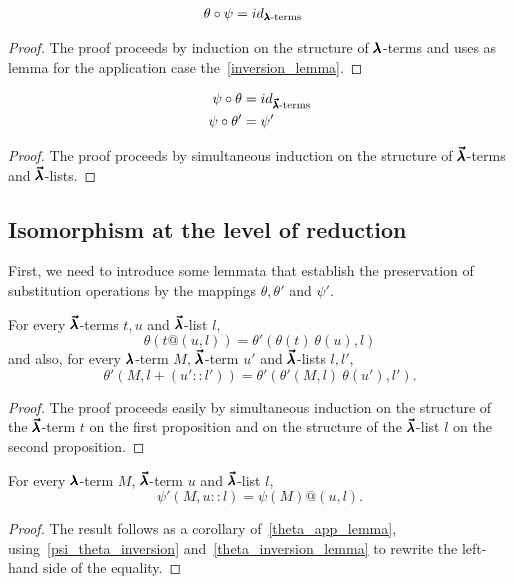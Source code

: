 \begin{theorem}
  \label{theta_psi_inversion}
  \begin{align*}
    \theta \circ \psi &= id_{\pmb{\lambda} \text{-terms}}
  \end{align*}
\end{theorem}
\begin{proof}
  The proof proceeds by induction on the structure of $\pmb{\lambda}$-terms and uses as lemma for the application case the~\cref{inversion_lemma}.
\end{proof}


\begin{theorem}
  \label{psi_theta_inversion}
  \begin{align*}
    \psi \circ \theta &= id_{\pmb{\vec \lambda} \text{-terms}} \\
    \psi \circ \theta' &= \psi'    
  \end{align*}
\end{theorem}
\begin{proof}
  The proof proceeds by simultaneous induction on the structure of $\pmb{\vec \lambda}$-terms and $\pmb{\vec \lambda}$-lists.
\end{proof}


\subsection{Isomorphism at the level of reduction}

First, we need to introduce some lemmata that establish the preservation of substitution operations by the mappings $\theta, \theta'$ and $\psi'$.

\begin{lemma}
  \label{theta_app_lemma}
  For every $\pmb{\vec \lambda}$-terms $t, u$ and $\pmb{\vec \lambda}$-list $l$,
  \[ \theta(t@(u, l)) = \theta'(\theta(t) \ \theta(u), l) \]
  and also, for every $\pmb{\lambda}$-term $M$, $\pmb{\vec \lambda}$-term $u'$ and $\pmb{\vec \lambda}$-lists $l, l'$,
  \[ \theta'(M, l+(u'::l')) = \theta'(\theta'(M, l) \ \theta(u'), l'). \]
\end{lemma}
\begin{proof}
  The proof proceeds easily by simultaneous induction on the structure of the $\pmb{\vec \lambda}$-term $t$ on the first proposition and on the structure of the $\pmb{\vec \lambda}$-list $l$ on the second proposition.
\end{proof}

\begin{corollary}
  \label{psi_app_lemma}
  For every $\pmb{\lambda}$-term $M$, $\pmb{\vec \lambda}$-term $u$ and $\pmb{\vec \lambda}$-list $l$,
  \[ \psi'(M, u :: l) = \psi(M)@(u, l). \]
\end{corollary}
\begin{proof}
  The result follows as a corollary of~\cref{theta_app_lemma}, using~\cref{psi_theta_inversion} and~\cref{theta_inversion_lemma} to rewrite the left-hand side of the equality.
\end{proof}

